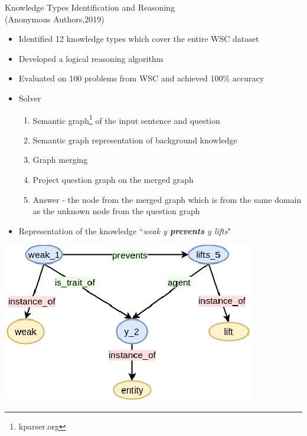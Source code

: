 \documentclass[smaller,dvipsnames,ratio=169]{beamer}
\begin{document}
\begin{frame}{Knowledge Types Identification and Reasoning \\(Anonymous Authors,2019)}
	
	\begin{itemize}
		\normalsize
		\item Identified 12 \alert{knowledge types} which cover the entire WSC dataset
		\item Developed a \alert{logical reasoning algorithm} 
		\item Evaluated on 100 problems from WSC and achieved \alert{100\%} accuracy
		\item Solver
		\begin{enumerate}
			\normalsize
			\item Semantic graph\footnote{kparser.org} of the input sentence and question
			\item Semantic graph representation of background knowledge
			\item Graph merging
			\item Project question graph on the merged graph
			\item Answer - the node from the merged graph which is from the same domain as the unknown node from the question graph
		\end{enumerate}
	\end{itemize}
\end{frame}

\begin{frame}
	\begin{itemize}
		\normalsize
		\item Representation of the knowledge ``\textit{weak y \textbf{prevents} y lifts}"
	\end{itemize}
	
		\centering
		\includegraphics[scale=0.3]{Figure4_c.png}  
	
   
\end{frame}
\end{document}

